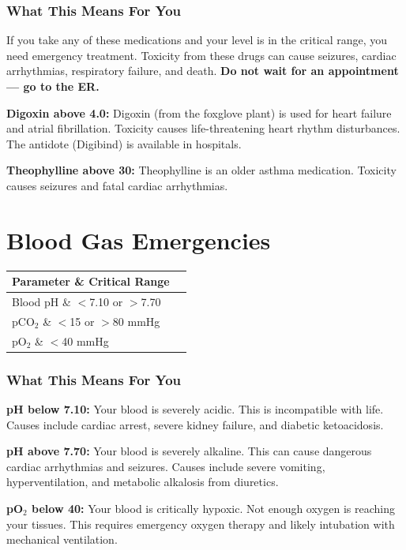 \subsubsection{What This Means For You}

If you take any of these medications and your level is in the critical range, you need emergency treatment. Toxicity from these drugs can cause seizures, cardiac arrhythmias, respiratory failure, and death. \textbf{Do not wait for an appointment --- go to the ER.}

\textbf{Digoxin above 4.0:} Digoxin (from the foxglove plant) is used for heart failure and atrial fibrillation. Toxicity causes life-threatening heart rhythm disturbances. The antidote (Digibind) is available in hospitals.

\textbf{Theophylline above 30:} Theophylline is an older asthma medication. Toxicity causes seizures and fatal cardiac arrhythmias.

\clearpage
\section{Blood Gas Emergencies}

\begin{longtable}{@{}ll@{}}
\toprule
\textbf{Parameter} \& \textbf{Critical Range} \\
\midrule
Blood pH \& $<$7.10 or $>$7.70 \\
pCO$_2$ \& $<$15 or $>$80 mmHg \\
pO$_2$ \& $<$40 mmHg \\
\bottomrule
\end{longtable}

\subsubsection{What This Means For You}

\textbf{pH below 7.10:} Your blood is severely acidic. This is incompatible with life. Causes include cardiac arrest, severe kidney failure, and diabetic ketoacidosis.

\textbf{pH above 7.70:} Your blood is severely alkaline. This can cause dangerous cardiac arrhythmias and seizures. Causes include severe vomiting, hyperventilation, and metabolic alkalosis from diuretics.

\textbf{pO$_2$ below 40:} Your blood is critically hypoxic. Not enough oxygen is reaching your tissues. This requires emergency oxygen therapy and likely intubation with mechanical ventilation.

